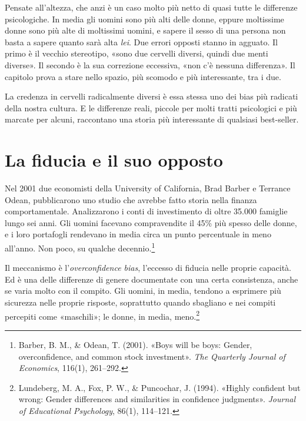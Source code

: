 Pensate all'altezza, che anzi è un caso molto più netto di quasi tutte le differenze psicologiche. In media gli uomini sono più alti delle donne, eppure moltissime donne sono più alte di moltissimi uomini, e sapere il sesso di una persona non basta a sapere quanto sarà alta \textit{lei}. Due errori opposti stanno in agguato. Il primo è il vecchio stereotipo, «sono due cervelli diversi, quindi due menti diverse». Il secondo è la sua correzione eccessiva, «non c'è nessuna differenza». Il capitolo prova a stare nello spazio, più scomodo e più interessante, tra i due.


La credenza in cervelli radicalmente diversi è essa stessa uno dei bias più radicati della nostra cultura. E le differenze reali, piccole per molti tratti psicologici e più marcate per alcuni, raccontano una storia più interessante di qualsiasi best-seller.

\section{La fiducia e il suo opposto}

Nel 2001 due economisti della University of California, Brad Barber e Terrance Odean, pubblicarono uno studio che avrebbe fatto storia nella finanza comportamentale. Analizzarono i conti di investimento di oltre 35.000 famiglie lungo sei anni. Gli uomini facevano compravendite il 45\% più spesso delle donne, e i loro portafogli rendevano in media circa un punto percentuale in meno all'anno. Non poco, su qualche decennio.\footnote{Barber, B. M., \& Odean, T. (2001). «Boys will be boys: Gender, overconfidence, and common stock investment». \textit{The Quarterly Journal of Economics}, 116(1), 261--292.}

Il meccanismo è l'\textit{overconfidence bias}, l'eccesso di fiducia nelle proprie capacità. Ed è una delle differenze di genere documentate con una certa consistenza, anche se varia molto con il compito. Gli uomini, in media, tendono a esprimere più sicurezza nelle proprie risposte, soprattutto quando sbagliano e nei compiti percepiti come «maschili»; le donne, in media, meno.\footnote{Lundeberg, M. A., Fox, P. W., \& Puncochar, J. (1994). «Highly confident but wrong: Gender differences and similarities in confidence judgments». \textit{Journal of Educational Psychology}, 86(1), 114--121.}

